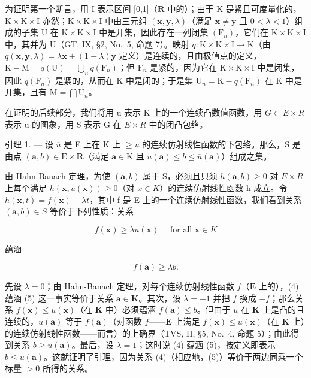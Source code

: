 为证明第一个断言，用 I 表示区间 {[}0,1{]}（\(\mathbf{R}\) 中的）；由于 K 是紧且可度量化的，\(\mathrm{K} \times \mathrm{K} \times \mathrm{I}\) 亦然；\(\mathrm{K} \times \mathrm{K} \times \mathrm{I}\) 中由三元组 \((\mathbf{x}, \mathbf{y}, \lambda)\)（满足 \(\mathbf{x} \neq \mathbf{y}\) 且 \(0 < \lambda < 1\)）组成的子集 U 在 \(\mathrm{K} \times \mathrm{K} \times \mathrm{I}\) 中是开集，因此存在一列闭集 \((\mathrm{F}_n)\)，它们在 \(\mathrm{K} \times \mathrm{K} \times \mathrm{I}\) 中，其并为 U（GT, IX, §2, No.~5, 命题 7）。映射 \(q: \mathrm{K} \times \mathrm{K} \times \mathrm{I} \to \mathrm{K}\)（由 \(q(\mathbf{x}, \mathbf{y}, \lambda) = \lambda \mathbf{x} + (1 - \lambda) \mathbf{y}\) 定义）是连续的，且由极值点的定义，\(\mathrm{K} - \mathrm{M} = q(\mathrm{U}) = \bigcup_{n} q(\mathrm{F}_n)\)；但 \(\mathrm{F}_n\) 是紧的，因为它在 \(\mathrm{K} \times \mathrm{K} \times \mathrm{I}\) 中是闭集，因此 \(q(\mathrm{F}_n)\) 是紧的，从而在 K 中是闭的；于是集 \(\mathrm{U}_n = \mathrm{K} - q(\mathrm{F}_n)\) 在 K 中是开集，且有 \(\mathrm{M} = \bigcap \mathrm{U}_n\)。

在证明的后续部分，我们将用 u 表示 K 上的一个连续凸数值函数，用 \(G \subset E \times R\) 表示 u 的图象，用 S 表示 G 在 \(E \times R\) 中的闭凸包络。

引理 1. --- 设 \(\overline{u}\) 是 E 上在 K 上 \(\geqslant u\) 的连续仿射线性函数的下包络。那么，S 是由点 \((\mathbf{a}, b) \in \mathrm{E} \times \mathbf{R}\)（满足 \(\mathbf{a} \in \mathrm{K}\) 且 \(u(\mathbf{a}) \leqslant b \leqslant \overline{u}(\mathbf{a})\)）组成之集。

由 Hahn-Banach 定理，为使 \((\mathbf{a}, b)\) 属于 S，必须且只须 \(h(\mathbf{a}, b) \geqslant 0\) 对 \(E \times R\) 上每个满足 \(h(\mathbf{x}, u(\mathbf{x})) \geqslant 0\)（对 \(x \in K\)）的连续仿射线性函数 h 成立。令 \(h(\mathbf{x}, t) = f(\mathbf{x}) - \lambda t\)，其中 f 是 E 上的一个连续仿射线性函数，我们看到关系 \((\mathbf{a}, b) \in S\) 等价于下列性质：关系

\[
f (\mathbf {x}) \geqslant \lambda u (\mathbf {x}) \quad \text { for   all } \mathbf {x} \in K\tag{4}
\]

蕴涵

\[
f (\mathbf {a}) \geqslant \lambda b.\tag{5}
\]

先设 \(\lambda = 0\)；由 Hahn-Banach 定理，对每个连续仿射线性函数 \(f\)（\(\mathbf{E}\) 上的），(4) 蕴涵 (5) 这一事实等价于关系 \(\mathbf{a} \in \mathbf{K}\)。其次，设 \(\lambda = -1\) 并把 \(f\) 换成 \(-f\)；那么关系 \(f(\mathbf{x}) \leqslant u(\mathbf{x})\)（在 \(\mathbf{K}\) 中）必须蕴涵 \(f(\mathbf{a}) \leqslant b\)。但由于 \(u\) 在 \(\mathbf{K}\) 上是凸的且连续的，\(u(\mathbf{a})\) 等于 \(f(\mathbf{a})\)（对函数 \(f\)——\(\mathbf{E}\) 上满足 \(f(\mathbf{x}) \leqslant u(\mathbf{x})\)（在 \(\mathbf{K}\) 上）的连续仿射线性函数——而言）的上确界（TVS, II, §5, No.~4, 命题 5）；由此得到关系 \(b \geqslant u(\mathbf{a})\)。最后，设 \(\lambda = 1\)；这时说 (4) 蕴涵 (5)，按定义即表示 \(b \leqslant \overline{u}(\mathbf{a})\)。这就证明了引理，因为关系 (4)（相应地，(5)）等价于两边同乘一个标量 \(>0\) 所得的关系。

